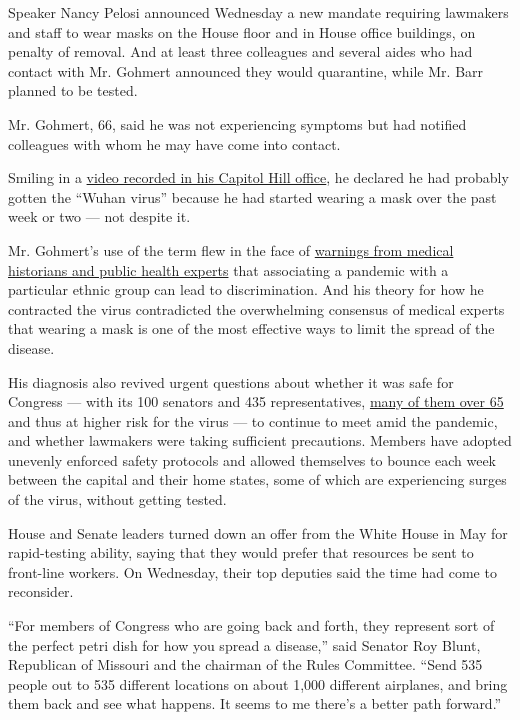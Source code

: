 Speaker Nancy Pelosi announced Wednesday a new mandate requiring
lawmakers and staff to wear masks on the House floor and in House office
buildings, on penalty of removal. And at least three colleagues and
several aides who had contact with Mr. Gohmert announced they would
quarantine, while Mr. Barr planned to be tested.

Mr. Gohmert, 66, said he was not experiencing symptoms but had notified
colleagues with whom he may have come into contact.

Smiling in a
\href{https://twitter.com/replouiegohmert/status/1288522631000489985?s=20}{video
recorded in his Capitol Hill office}, he declared he had probably gotten
the ``Wuhan virus'' because he had started wearing a mask over the past
week or two --- not despite it.

Mr. Gohmert's use of the term flew in the face of
\href{https://www.nytimes.com/2020/03/18/us/politics/china-virus.html}{warnings
from medical historians and public health experts} that associating a
pandemic with a particular ethnic group can lead to discrimination. And
his theory for how he contracted the virus contradicted the overwhelming
consensus of medical experts that wearing a mask is one of the most
effective ways to limit the spread of the disease.

His diagnosis also revived urgent questions about whether it was safe
for Congress --- with its 100 senators and 435 representatives,
\href{https://www.nytimes.com/2020/03/11/upshot/coronavirus-older-lawmakers-congress-risk.html}{many
of them over 65} and thus at higher risk for the virus --- to continue
to meet amid the pandemic, and whether lawmakers were taking sufficient
precautions. Members have adopted unevenly enforced safety protocols and
allowed themselves to bounce each week between the capital and their
home states, some of which are experiencing surges of the virus, without
getting tested.

House and Senate leaders turned down an offer from the White House in
May for rapid-testing ability, saying that they would prefer that
resources be sent to front-line workers. On Wednesday, their top
deputies said the time had come to reconsider.

``For members of Congress who are going back and forth, they represent
sort of the perfect petri dish for how you spread a disease,'' said
Senator Roy Blunt, Republican of Missouri and the chairman of the Rules
Committee. ``Send 535 people out to 535 different locations on about
1,000 different airplanes, and bring them back and see what happens. It
seems to me there's a better path forward.''

